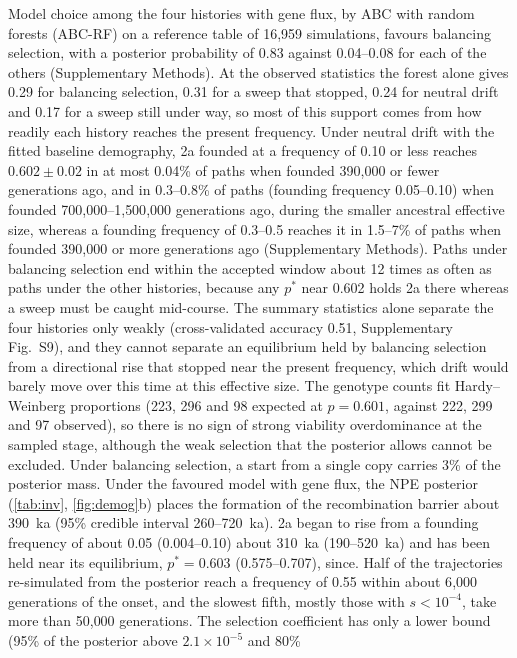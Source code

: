 \documentclass[11pt]{article}
\begin{document}
Model choice among the four histories with gene flux, by ABC with random forests (ABC-RF) \citep{pudlo2016} on a
reference table of 16{,}959 simulations, favours balancing selection, with a posterior probability of 0.83 against 0.04--0.08 for each of the others (Supplementary Methods). At the observed statistics the forest alone gives 0.29 for balancing selection, 0.31 for a sweep that stopped, 0.24 for neutral drift and 0.17 for a sweep still under way, so most of this support comes from how readily each history reaches the present frequency. Under neutral drift with the fitted baseline demography, 2a founded at a frequency of 0.10 or less reaches $0.602\pm0.02$ in at most 0.04\% of paths when founded 390{,}000 or fewer generations ago, and in 0.3--0.8\% of paths (founding frequency 0.05--0.10) when founded 700{,}000--1{,}500{,}000 generations ago, during the smaller ancestral effective size, whereas a founding frequency of 0.3--0.5 reaches it in 1.5--7\% of paths when founded 390{,}000 or more generations ago (Supplementary Methods). Paths under balancing selection end within the accepted window about 12 times as
often as paths under the other histories, because any $p^{*}$ near 0.602 holds 2a there whereas a sweep must be caught
mid-course. The summary statistics alone separate the four histories only weakly (cross-validated accuracy 0.51, Supplementary Fig.~S9), and they cannot separate an equilibrium held by balancing selection from a directional rise that stopped near the present frequency, which drift would barely move over this time at this effective size. The genotype counts fit Hardy--Weinberg proportions (223, 296 and 98 expected at $p=0.601$, against 222, 299 and 97 observed), so there is no sign of strong viability overdominance at the sampled stage, although the weak selection that the posterior allows cannot be excluded. Under balancing selection, a start from a single copy carries 3\% of the posterior mass. Under
the favoured model with gene flux, the NPE posterior (\cref{tab:inv}, \cref{fig:demog}b) places the formation of the
recombination barrier about 390~ka (95\% credible interval 260--720~ka). 2a began to rise from a founding frequency
of about 0.05 (0.004--0.10) about 310~ka (190--520~ka) and has been held near its equilibrium, $p^{*}=0.603$
(0.575--0.707), since. Half of the trajectories re-simulated from the posterior reach a frequency of 0.55 within
about 6{,}000 generations of the onset, and the slowest fifth, mostly those with $s<10^{-4}$, take more than 50{,}000 generations. The selection coefficient has only a lower bound (95\% of the posterior above $2.1\times10^{-5}$ and 80\%
\end{document}
